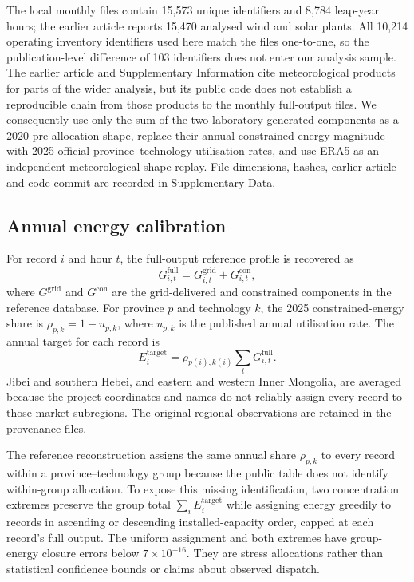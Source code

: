 \documentclass[11pt,a4paper]{article}
\begin{document}
The local monthly files contain 15,573 unique identifiers and 8,784 leap-year hours; the earlier article reports 15,470 analysed wind and solar plants. All 10,214 operating inventory identifiers used here match the files one-to-one, so the publication-level difference of 103 identifiers does not enter our analysis sample. The earlier article and Supplementary Information cite meteorological products for parts of the wider analysis, but its public code does not establish a reproducible chain from those products to the monthly full-output files. We consequently use only the sum of the two laboratory-generated components as a 2020 pre-allocation shape, replace their annual constrained-energy magnitude with 2025 official province--technology utilisation rates, and use ERA5 as an independent meteorological-shape replay. File dimensions, hashes, earlier article and code commit are recorded in Supplementary Data.

\subsection{Annual energy calibration}

For record $i$ and hour $t$, the full-output reference profile is recovered as
\begin{equation}
G^{\mathrm{full}}_{i,t}=G^{\mathrm{grid}}_{i,t}+G^{\mathrm{con}}_{i,t},
\label{eq:fulloutput}
\end{equation}
where $G^{\mathrm{grid}}$ and $G^{\mathrm{con}}$ are the grid-delivered and constrained components in the reference database. For province $p$ and technology $k$, the 2025 constrained-energy share is $\rho_{p,k}=1-u_{p,k}$, where $u_{p,k}$ is the published annual utilisation rate. The annual target for each record is
\begin{equation}
E^{\mathrm{target}}_i=\rho_{p(i),k(i)}\sum_t G^{\mathrm{full}}_{i,t}.
\label{eq:annualtarget}
\end{equation}
Jibei and southern Hebei, and eastern and western Inner Mongolia, are averaged because the project coordinates and names do not reliably assign every record to those market subregions. The original regional observations are retained in the provenance files.

The reference reconstruction assigns the same annual share $\rho_{p,k}$ to every record within a province--technology group because the public table does not identify within-group allocation. To expose this missing identification, two concentration extremes preserve the group total $\sum_i E_i^{\mathrm{target}}$ while assigning energy greedily to records in ascending or descending installed-capacity order, capped at each record's full output. The uniform assignment and both extremes have group-energy closure errors below $7\times10^{-16}$. They are stress allocations rather than statistical confidence bounds or claims about observed dispatch.
\end{document}
